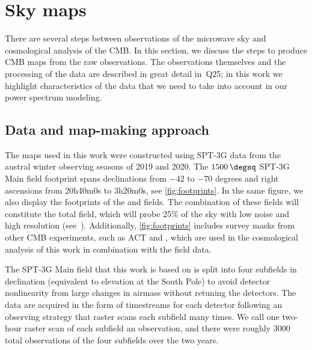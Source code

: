 
\section{Sky maps}
\label{sec:maps}

There are several steps between observations of the microwave sky and cosmological analysis of the CMB. 
In this section, we discuss the steps to produce CMB maps from the raw observations.
The observations themselves and the processing of the data are described in great detail in~Q25; in this work we highlight characteristics of the data that we need to take into account in our power spectrum modeling. 

\subsection{Data and map-making approach}
\label{sec:map-making}
The maps used in this work were constructed using SPT-3G data from the austral winter observing seasons of 2019 and 2020. 
The $1500\,\degsq$ SPT-3G Main field footprint spans declinations from $-42$ to $-70$ degrees and right ascensions from 20h40m0s to 3h20m0s, see \cref{fig:footprints}.
In the same figure, we also display the footprints of the \summerfield{} and \extfield{} fields. 
The combination of these \sptnew{} fields will constitute the total \allspt{} field, 
which will probe 25\% of the sky with low noise and high resolution (see~\citep{prabhu24}). 
Additionally, \cref{fig:footprints} includes survey masks from other CMB experiments, such as ACT and \planck{}, which are used in the cosmological analysis of this work in combination with the \mainfield{} field data.

The SPT-3G Main field that this work is based on is split into four subfields in declination (equivalent to elevation at the South Pole) to avoid detector nonlinearity from large changes in airmass without retuning the detectors.
The data are acquired in the form of timestreams for each detector following an observing strategy that raster scans each subfield many times.
We call one two-hour raster scan of each subfield an {observation}, and there were roughly 3000 total observations of the four subfields over the two years.

